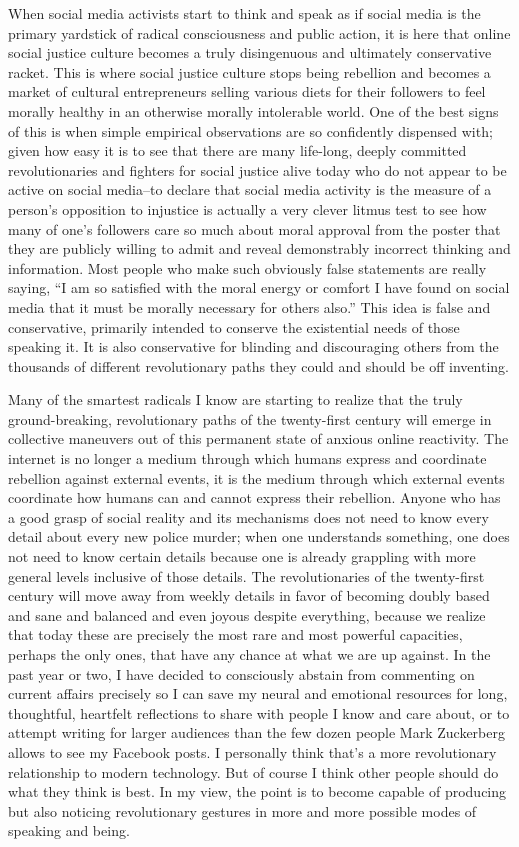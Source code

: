 \documentclass[a4paper,12pt,margin=.5in]{article}
\begin{document}
When social media activists start to think and speak as if social media
is the primary yardstick of radical consciousness and public action, it
is here that online social justice culture becomes a truly disingenuous
and ultimately conservative racket. This is where social justice culture
stops being rebellion and becomes a market of cultural entrepreneurs
selling various diets for their followers to feel morally healthy in an
otherwise morally intolerable world. One of the best signs of this is
when simple empirical observations are so confidently dispensed with;
given how easy it is to see that there are many life-long, deeply
committed revolutionaries and fighters for social justice alive today
who do not appear to be active on social media--to declare that social
media activity is the measure of a person's opposition to injustice is
actually a very clever litmus test to see how many of one's followers
care so much about moral approval from the poster that they are publicly
willing to admit and reveal demonstrably incorrect thinking and
information. Most people who make such obviously false statements are
really saying, ``I am so satisfied with the moral energy or comfort I
have found on social media that it must be morally necessary for others
also.'' This idea is false and conservative, primarily intended to
conserve the existential needs of those speaking it. It is also
conservative for blinding and discouraging others from the thousands of
different revolutionary paths they could and should be off inventing.

Many of the smartest radicals I know are starting to realize that the
truly ground-breaking, revolutionary paths of the twenty-first century
will emerge in collective maneuvers out of this permanent state of
anxious online reactivity. The internet is no longer a medium through
which humans express and coordinate rebellion against external events,
it is the medium through which external events coordinate how humans can
and cannot express their rebellion. Anyone who has a good grasp of
social reality and its mechanisms does not need to know every detail
about every new police murder; when one understands something, one does
not need to know certain details because one is already grappling with
more general levels inclusive of those details. The revolutionaries of
the twenty-first century will move away from weekly details in favor of
becoming doubly based and sane and balanced and even joyous despite
everything, because we realize that today these are precisely the most
rare and most powerful capacities, perhaps the only ones, that have any
chance at what we are up against. In the past year or two, I have
decided to consciously abstain from commenting on current affairs
precisely so I can save my neural and emotional resources for long,
thoughtful, heartfelt reflections to share with people I know and care
about, or to attempt writing for larger audiences than the few dozen
people Mark Zuckerberg allows to see my Facebook posts. I personally
think that's a more revolutionary relationship to modern technology. But
of course I think other people should do what they think is best. In my
view, the point is to become capable of producing but also noticing
revolutionary gestures in more and more possible modes of speaking and
being.
\end{document}
